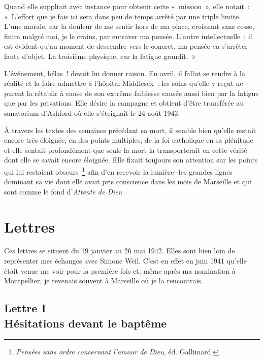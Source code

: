 \documentclass[french,twoside]{book} %
\newcommand{\signed}[1]{\bigbreak\filbreak{\raggedleft #1\par}\medskip}
\newcommand\chapteropen{} %
\newcommand\chaptercont{} %
\newcommand\chapterclose{} %
\begin{document}
Quand elle suppliait avec instance pour obtenir cette « mission », elle notait : « L'effort que je fais ici sera dans peu de temps arrêté par une triple limite. L'une morale, car la douleur de me sentir hors de ma place, croissant sans cesse, finira malgré moi, je le crains, par entraver ma pensée. L'autre intellectuelle ; il est évident qu'au moment de descendre vers le concret, ma pensée va s'arrêter faute d'objet. La troisième physique, car la fatigue grandit. »\par
L'événement, hélas ! devait lui donner raison. En avril, il fallut se rendre à la réalité et la faire admettre à l'hôpital Middlesex ; les soins qu'elle y reçut ne purent la rétablir à cause de son extrême faiblesse causée aussi bien par la fatigue que par les privations. Elle désire la campagne et obtient d'être transférée au sanatorium d'Ashford où elle s'éteignait le 24 août 1943.\par
À travers les textes des semaines précédant sa mort, il semble bien qu'elle restait encore très éloignée, en des points multiples, de la foi catholique en sa plénitude et elle sentait profondément que seule la mort la transporterait en cette vérité dont elle se savait encore éloignée. Elle fixait toujours son attention sur les points qui lui restaient obscurs \footnote{{\itshape Pensées sans ordre concernant l'amour de Dieu}, éd. Gallimard.} afin d'en recevoir la lumière -les grandes lignes dominant sa vie dont elle avait pris conscience dans les mois de Marseille et qui sont comme le fond d'{\itshape Attente de Dieu.}\par


\signed{J.-M. Perrin.}
\chapterclose

\mainmatter 
\chapteropen
\part[Lettres]{Lettres}\renewcommand{\leftmark}{Lettres}


\chaptercont
\noindent Ces lettres se situent du 19 janvier au 26 mai 1942. Elles sont bien loin de représenter mes échanges avec Simone Weil. C'est en effet en juin 1941 qu'elle était venue me voir pour la première fois et, même après ma nomination à Montpellier, je revenais souvent à Marseille où je la rencontrais.\par

\chapteropen
\chapter[Lettre I. Hésitations devant le baptême]{Lettre I \\
Hésitations devant le baptême}
\end{document}
